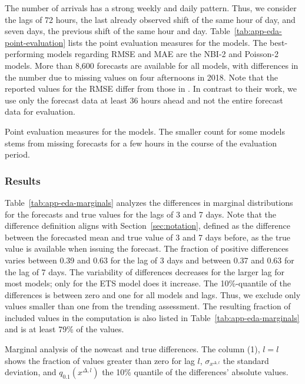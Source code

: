 The number of arrivals has a strong weekly and daily pattern.
Thus, we consider the lags of 72 hours, the last already observed shift of the same hour of day, and seven days, the previous shift of the same hour and day.
Table~\ref{tab:app-eda-point-evaluation} lists the point evaluation measures for the models.
The best-performing models regarding RMSE and MAE are the NBI-2 and Poisson-2 models.
More than 8,600 forecasts are available for all models, with differences in the number due to missing values on four afternoons in 2018.
Note that the reported values for the RMSE differ from those in \textcite{Rostami-Tabar2023}.
In contrast to their work, we use only the forecast data at least 36 hours ahead and not the entire forecast data for evaluation.

\begin{table}
\centering

\caption{Point evaluation measures for the models. The smaller count for some models stems from missing forecasts for a few hours in the course of the evaluation period.}\label{tab:app-eda-point-evaluation}
\end{table}


\subsubsection*{Results}

Table~\ref{tab:app-eda-marginals} analyzes the differences in marginal distributions for the forecasts and true values for the lags of 3 and 7 days.
Note that the difference definition aligns with Section~\ref{sec:notation}, defined as the difference between the forecasted mean and true value of 3 and 7 days before, as the true value is available when issuing the forecast.
The fraction of positive differences varies between 0.39 and 0.63 for the lag of 3 days and between 0.37 and 0.63 for the lag of 7 days.
The variability of differences decreases for the larger lag for most models; only for the ETS model does it increase.
The 10\%-quantile of the differences is between zero and one for all models and lags.
Thus, we exclude only values smaller than one from the trending assessment.
The resulting fraction of included values in the computation is also listed in Table~\ref{tab:app-eda-marginals} and is at least 79\% of the values.

\begin{table}
    \centering
    
    \caption{Marginal analysis of the nowcast and true differences. The column (1), $l=l$ shows the fraction of values greater than zero for lag $l$, $\sigma_{x^{\Delta, l}}$ the standard deviation, and $q_{0.1} (x^{\Delta, l})$ the 10\% quantile of the differences' absolute values.}
    \label{tab:app-eda-marginals}
\end{table}


